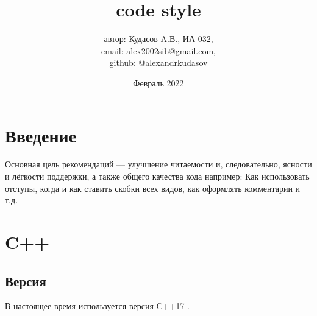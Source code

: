 \documentclass{article}
\title{code style}
\author{автор: Кудасов A.В., ИА-032,\\email: alex2002sib@gmail.com,\\ github: @alexandrkudasov}
\date{Февраль 2022}
\begin{document}
\maketitle

\section{Введение}
Основная цель рекомендаций — улучшение читаемости и, следовательно, ясности и лёгкости поддержки, а также общего качества кода например:
Как использовать отступы, когда и как ставить скобки всех видов, как оформлять комментарии и т.д.
\section{C++}

\subsection{Версия}
В настоящее время используется версия C++17 \cite{CPP}.
\end{document}
